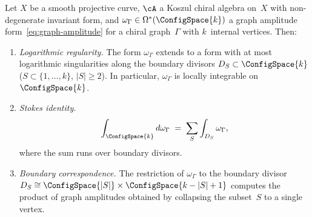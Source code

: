 \begin{proposition}\label{prop:stokes-regularity-FM}
Let $X$ be a smooth projective curve, $\cA$ a Koszul chiral algebra
on~$X$ with non-degenerate invariant form, and
$\omega_\Gamma \in \Omega^*(\ConfigSpace{k})$
a graph amplitude form~\eqref{eq:graph-amplitude} for a chiral
graph~$\Gamma$ with $k$~internal vertices.  Then:
\begin{enumerate}[label=\textup{(\alph*)}]
\item \emph{Logarithmic regularity.}
  The form $\omega_\Gamma$ extends to a form with at most logarithmic
  singularities along the boundary divisors $D_S \subset
  \ConfigSpace{k}$
  \textup{(}$S \subset \{1,\ldots,k\}$, $|S|\geq 2$\textup{)}.
  In particular, $\omega_\Gamma$ is locally integrable on
  $\ConfigSpace{k}$.
\item \emph{Stokes identity.}
  \begin{equation}\label{eq:stokes-FM}
  \int_{\ConfigSpace{k}} d\omega_\Gamma
  \;=\;
  \sum_{S} \int_{D_S} \omega_\Gamma,
  \end{equation}
  where the sum runs over boundary divisors.
\item \emph{Boundary correspondence.}
  The restriction of $\omega_\Gamma$ to the boundary divisor
  $D_S \cong \ConfigSpace{|S|} \times \ConfigSpace{k-|S|+1}$
  computes the product of graph amplitudes obtained by collapsing
  the subset~$S$ to a single vertex.
\end{enumerate}
\end{proposition}

